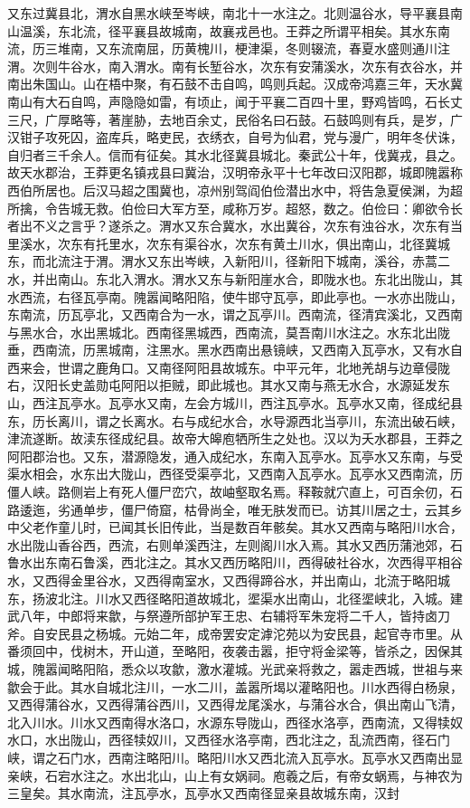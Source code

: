 \documentclass[12pt,UTF8]{ctexbook}
\begin{document}
又东过冀县北，渭水自黑水峡至岑峡，南北十一水注之。北则温谷水，导平襄县南山温溪，东北流，径平襄县故城南，故襄戎邑也。王莽之所谓平相矣。其水东南流，历三堆南，又东流南屈，历黄槐川，梗津渠，冬则辍流，春夏水盛则通川注渭。次则牛谷水，南入渭水。南有长堑谷水，次东有安蒲溪水，次东有衣谷水，并南出朱国山。山在梧中聚，有石鼓不击自鸣，鸣则兵起。汉成帝鸿嘉三年，天水冀南山有大石自鸣，声隐隐如雷，有顷止，闻于平襄二百四十里，野鸡皆鸣，石长丈三尺，广厚略等，著崖胁，去地百余丈，民俗名曰石鼓。石鼓鸣则有兵，是岁，广汉钳子攻死囚，盗库兵，略吏民，衣绣衣，自号为仙君，党与漫广，明年冬伏诛，自归者三千余人。信而有征矣。其水北径冀县城北。秦武公十年，伐冀戎，县之。故天水郡治，王莽更名镇戎县曰冀治，汉明帝永平十七年改曰汉阳郡，城即隗嚣称西伯所居也。后汉马超之围冀也，凉州别驾阎伯俭潜出水中，将告急夏侯渊，为超所擒，令告城无救。伯俭曰大军方至，咸称万岁。超怒，数之。伯俭曰：卿欲令长者出不义之言乎？遂杀之。渭水又东合冀水，水出冀谷，次东有浊谷水，次东有当里溪水，次东有托里水，次东有渠谷水，次东有黄土川水，俱出南山，北径冀城东，而北流注于渭。渭水又东出岑峡，入新阳川，径新阳下城南，溪谷，赤蒿二水，并出南山。东北入渭水。渭水又东与新阳崖水合，即陇水也。东北出陇山，其水西流，右径瓦亭南。隗嚣闻略阳陷，使牛邯守瓦亭，即此亭也。一水亦出陇山，东南流，历瓦亭北，又西南合为一水，谓之瓦亭川。西南流，径清宾溪北，又西南与黑水合，水出黑城北。西南径黑城西，西南流，莫吾南川水注之。水东北出陇垂，西南流，历黑城南，注黑水。黑水西南出悬镜峡，又西南入瓦亭水，又有水自西来会，世谓之鹿角口。又南径阿阳县故城东。中平元年，北地羌胡与边章侵陇右，汉阳长史盖勋屯阿阳以拒贼，即此城也。其水又南与燕无水合，水源延发东山，西注瓦亭水。瓦亭水又南，左会方城川，西注瓦亭水。瓦亭水又南，径成纪县东，历长离川，谓之长离水。右与成纪水合，水导源西北当亭川，东流出破石峡，津流遂断。故渎东径成纪县。故帝大皞庖牺所生之处也。汉以为夭水郡县，王莽之阿阳郡治也。又东，潜源隐发，通入成纪水，东南入瓦亭水。瓦亭水又东南，与受渠水相会，水东出大陇山，西径受渠亭北，又西南入瓦亭水。瓦亭水又西南流，历僵人峡。路侧岩上有死人僵尸峦穴，故岫壑取名焉。释鞍就穴直上，可百余仞，石路逶迤，劣通单步，僵尸倚窟，枯骨尚全，唯无肤发而已。访其川居之士，云其乡中父老作童儿时，已闻其长旧传此，当是数百年骸矣。其水又西南与略阳川水合，水出陇山香谷西，西流，右则单溪西注，左则阁川水入焉。其水又西历蒲池郊，石鲁水出东南石鲁溪，西北注之。其水又西历略阳川，西得破社谷水，次西得平相谷水，又西得金里谷水，又西得南室水，又西得蹄谷水，并出南山，北流于略阳城东，扬波北注。川水又西径略阳道故城北，埿渠水出南山，北径埿峡北，入城。建武八年，中郎将来歙，与祭遵所部护军王忠、右辅将军朱宠将二千人，皆持卤刀斧。自安民县之杨城。元始二年，成帝罢安定滹沱苑以为安民县，起官寺市里。从番须回中，伐树木，开山道，至略阳，夜袭击嚣，拒守将金梁等，皆杀之，因保其城，隗嚣闻略阳陷，悉众以攻歙，激水灌城。光武亲将救之，嚣走西城，世祖与来歙会于此。其水自城北注川，一水二川，盖嚣所堨以灌略阳也。川水西得白杨泉，又西得蒲谷水，又西得蒲谷西川，又西得龙尾溪水，与蒲谷水合，俱出南山飞清，北入川水。川水又西南得水洛口，水源东导陇山，西径水洛亭，西南流，又得犊奴水口，水出陇山，西径犊奴川，又西径水洛亭南，西北注之，乱流西南，径石门峡，谓之石门水，西南注略阳川。略阳川水又西北流入瓦亭水。瓦亭水又西南出显亲峡，石宕水注之。水出北山，山上有女娲祠。庖羲之后，有帝女蜗焉，与神农为三皇矣。其水南流，注瓦亭水，瓦亭水又西南径显亲县故城东南，汉封
\end{document}
